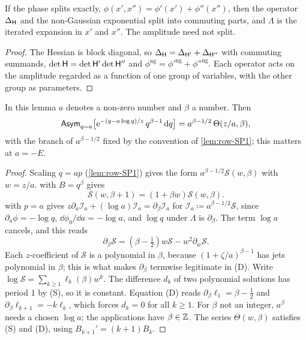 \begin{lem}[Fubini]
\label{lem:row-SP4}
If the phase splits exactly, $\phi(x',x'')=\phi'(x')+\phi''(x'')$, then the operator $\Delta_{\mathsf{H}}$ and the non-Gaussian exponential split into commuting parts, and $\Lambda$ is the iterated expansion in $x'$ and $x''$. The amplitude need not split.
\end{lem}

\begin{proof}
The Hessian is block diagonal, so $\Delta_{\mathsf{H}}=\Delta_{\mathsf{H}'}+\Delta_{\mathsf{H}''}$ with commuting summands, $\det\mathsf{H}=\det\mathsf{H}'\det\mathsf{H}''$ and $\phi^{\mathrm{ng}}=\phi'^{\mathrm{ng}}+\phi''^{\mathrm{ng}}$. Each operator acts on the amplitude regarded as a function of one group of variables, with the other group as parameters.
\end{proof}

\begin{lem}
\label{lem:row-SP5}
In this lemma $a$ denotes a non-zero number and $\beta$ a number. Then
\[
\mathsf{Asym}_{q=a}\big[\mathrm{e}^{-(q-a\log q)/z}\,q^{\beta-1}\,\mathrm{d} q\big]=a^{\beta-1/2}\,\Theta(z/a,\beta),
\]
with the branch of $a^{\beta-1/2}$ fixed by the convention of \cref{lem:row-SP1}; this matters at $a=-E$.
\end{lem}

\begin{proof}
Scaling $q=ap$ (\cref{lem:row-SP1}) gives the form $a^{\beta-1/2}\mathcal{S}(w,\beta)$ with $w=z/a$.  with $B=q^\beta$ gives
\begin{equation}
\tag{S}
\mathcal{S}(w,\beta+1)=(1+\beta w)\mathcal{S}(w,\beta).
\end{equation}
 with $p=a$ gives $z\partial_a\mathcal{I}_a+(\log a)\mathcal{I}_a=\partial_\beta \mathcal{I}_a$ for $\mathcal{I}_a\coloneqq a^{\beta-1/2}\mathcal{S}$, since $\partial_a\phi=-\log q$, $\dd\phi_0/\dd a=-\log a$, and $\log q$ under $\Lambda$ is $\partial_\beta$. The term $\log a$ cancels, and this reads
\begin{equation}
\tag{D}
\partial_\beta\mathcal{S}=(\beta-\tfrac12)w\mathcal{S}-w^2\partial_w\mathcal{S}.
\end{equation}
Each $z$-coefficient of $\mathcal{S}$ is a polynomial in $\beta$, because $(1+\zeta/a)^{\beta-1}$ has jets polynomial in $\beta$; this is what makes $\partial_\beta$ termwise legitimate in (D). Write $\log\mathcal{S}=\sum_{k\geq1}\ell_k(\beta)w^k$. The difference $d_k$ of two polynomial solutions has period $1$ by (S), so it is constant. Equation (D) reads $\partial_\beta\ell_1=\beta-\frac12$ and $\partial_\beta\ell_{k+1}=-k\ell_k$, which forces $d_k=0$ for all $k\geq1$. For $\beta$ not an integer, $a^\beta$ needs a chosen $\log a$; the applications have $\beta\in\mathbb{Z}$. The series $\Theta(w,\beta)$ satisfies (S) and (D), using $B_{k+1}'=(k+1)B_k$.
\end{proof}

